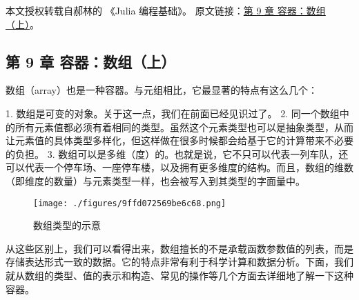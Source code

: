 
本文授权转载自郝林的 《Julia 编程基础》。 原文链接：\href{https://github.com/hyper0x/JuliaBasics/blob/master/book/ch09.md}{第 9 章 容器：数组（上）}。


\subsection{第 9 章 容器：数组（上）}

数组（array）也是一种容器。与元组相比，它最显著的特点有这么几个：

1. 数组是可变的对象。关于这一点，我们在前面已经见识过了。
2. 同一个数组中的所有元素值都必须有着相同的类型。虽然这个元素类型也可以是抽象类型，从而让元素值的具体类型多样化，但这样做在很多时候都会给基于它的计算带来不必要的负担。
3. 数组可以是多维（度）的。也就是说，它不只可以代表一列车队，还可以代表一个停车场、一座停车楼，以及拥有更多维度的结构。而且，数组的维数（即维度的数量）与元素类型一样，也会被写入到其类型的字面量中。

\begin{figure}[ht]
\centering
\texttt{[image: ./figures/9ffd072569be6c68.png]}
\caption{数组类型的示意} \label{fig_JuC9S0_1}
\end{figure}

从这些区别上，我们可以看得出来，数组擅长的不是承载函数参数值的列表，而是存储表达形式一致的数据。它的特点非常有利于科学计算和数据分析。下面，我们就从数组的类型、值的表示和构造、常见的操作等几个方面去详细地了解一下这种容器。